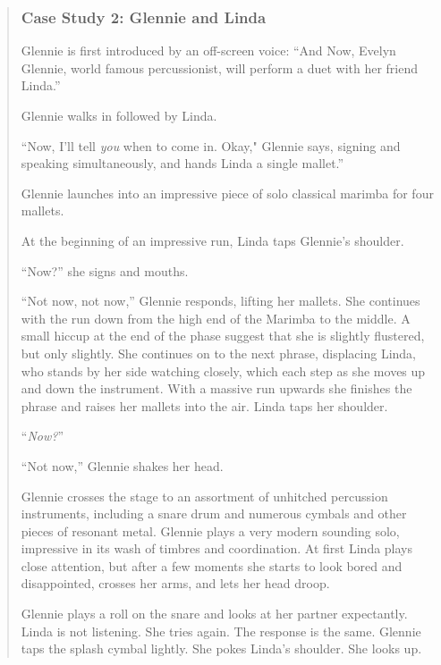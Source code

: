 \documentclass[12pt,letterpaper]{article}
\begin{document}
	\begin{quote}
	
	\subsubsection*{Case Study 2: Glennie and Linda}
	
	\ttfamily
	
	Glennie is first introduced by an off-screen voice: ``And Now, Evelyn 
	Glennie, world famous percussionist, will perform a duet with her 
	friend Linda.''

	Glennie walks in followed by Linda.  

	``Now, I'll tell \textit{you} when to come in. Okay," Glennie says, 
	signing and 
	speaking simultaneously, and hands Linda a single mallet.''  

	Glennie launches into an impressive piece of solo classical marimba for 
	four mallets. 

	At the beginning of an impressive run, Linda taps Glennie's shoulder.

	``Now?'' she signs and mouths.

	``Not now, not now,'' Glennie responds, lifting her mallets. She continues
	 with the run down from the high end of the Marimba to the middle. A 
	small hiccup at the end of the phase suggest that she is slightly 
	flustered, but only slightly. She continues on to the next phrase, 
	displacing Linda, who stands by her side watching closely, which each 
	step as she moves up and down the instrument. With a massive run upwards
	she finishes the phrase and raises her mallets into the air. Linda taps 
	her shoulder.

	``\textit{Now?}'' 

	``Not now,'' Glennie shakes her head. 

	Glennie crosses the stage to an assortment of unhitched percussion 
	instruments, including a snare drum and numerous cymbals and other 
	pieces of resonant metal. Glennie plays a very modern sounding solo, 
	impressive in its wash of timbres and coordination. At first Linda 
	plays close attention, but after a few moments she starts to look bored 
	and disappointed, crosses her arms, and lets her head droop.

	Glennie plays a roll on the snare and looks at her partner expectantly. 
	Linda is not listening. She tries again. The response is the same. 
	Glennie taps the splash cymbal lightly. She pokes Linda's shoulder. She 
	looks up.


\end{quote}
\end{document}
